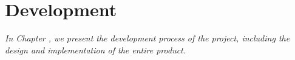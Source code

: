 \chapter{Development}

\textit{In Chapter \thechapter, we present the development process of the project, including the design and implementation of the entire product.}

% 
